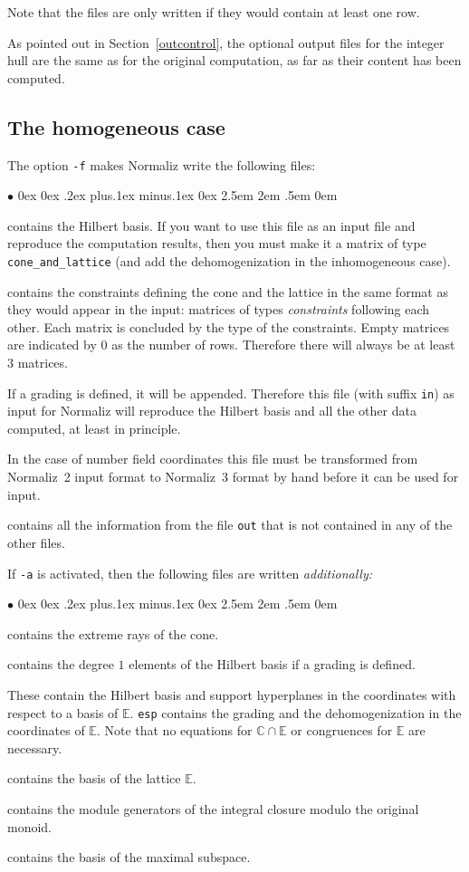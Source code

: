 \documentclass[12pt,a4paper]{scrartcl}
\newcommand{\stdli}{ \topsep0ex \partopsep0ex %
\parsep.2ex plus.1ex minus.1ex \itemsep0ex%
\leftmargin2.5em \labelwidth2em \labelsep.5em \rightmargin0em}%
\renewenvironment{itemize}{\begin{list}{{$\bullet$}}{\stdli}}{\end{list}}
\theoremstyle{definition}
\def\CC{{\mathbb C}}
\def\EE{{\mathbb E}}
\def\itemtt[#1]{\item[\textbf{\ttt{#1}}]}
\def\ttt{\texttt}
\begin{document}
Note that the files are only written if they would contain at least one row.

As pointed out in Section~\ref{outcontrol}, the optional output files for the integer hull are the same as for the original computation, as far as their content has been computed.

\subsection{The homogeneous case}

The option \ttt{-f} makes Normaliz write the following files:

\begin{itemize}
	\itemtt[gen] contains the Hilbert basis. If you want to use this file as an input file and reproduce the computation results, then you must make it a matrix of type \verb|cone_and_lattice| (and add the dehomogenization in the inhomogeneous case).
	
	\itemtt[cst] contains the constraints defining the cone
	and the lattice in the same format as they would appear
	in the input: matrices of types \emph{constraints} following each
	other. Each matrix is concluded by the type of the constraints.
	Empty matrices are indicated by $0$ as the
	number of rows. Therefore there will always be at least
	$3$ matrices.
	
	If a grading is defined, it will be appended. Therefore
	this file (with suffix \ttt{in}) as input for
	Normaliz will reproduce the Hilbert basis and all the
	other data computed, at least in principle.
	
	In the case of number field coordinates this file must be transformed from Normaliz~2 input format to Normaliz~3 format by hand before it can be used for input.
	
	\itemtt[inv] contains all the information from the
	file \ttt{out} that is not contained in any of the
	other files.
\end{itemize}

If \ttt{-a} is activated, then the following files are written
\emph{additionally:}

\begin{itemize}
	
	\itemtt[ext] contains the extreme rays of the cone.
	
	\itemtt[ht1] contains the degree $1$ elements of the
	Hilbert basis if a grading is defined.
	
	\itemtt[egn,esp] These contain the Hilbert basis and
	support hyperplanes in the coordinates with respect to
	a basis of $\EE$. \ttt{esp} contains the grading and the dehomogenization in the
	coordinates of $\EE$. Note that no
	equations for $\CC\cap\EE$ or congruences for $\EE$ are
	necessary.
	
	\itemtt[lat] contains the basis of the lattice $\EE$.
	
	\itemtt[mod] contains the module generators of the integral closure modulo the original monoid.
	
	\itemtt[msp] contains the basis of the maximal subspace.
\end{itemize}
\end{document}
